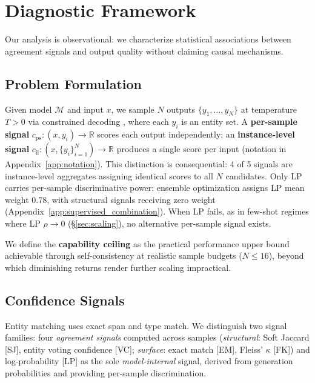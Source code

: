 \section{Diagnostic Framework}\label{sec:method}

Our analysis is observational: we characterize statistical associations between agreement signals and output quality without claiming causal mechanisms.

\subsection{Problem Formulation}\label{sec:formulation}

Given model $\mathcal{M}$ and input $x$, we sample $N$ outputs $\{y_1, \ldots, y_N\}$ at temperature $T > 0$ via constrained decoding \cite{willard2023guided}, where each $y_i$ is an entity set.
A \textbf{per-sample signal} $c_{\text{ps}}: (x, y_i) \to \mathbb{R}$ scores each output independently; an \textbf{instance-level signal} $c_{\text{il}}: (x, \{y_i\}_{i=1}^N) \to \mathbb{R}$ produces a single score per input (notation in Appendix~\ref{app:notation}).
This distinction is consequential: 4 of 5 signals are instance-level aggregates assigning identical scores to all $N$ candidates.
Only LP carries per-sample discriminative power: ensemble optimization assigns LP mean weight $0.78$, with structural signals receiving zero weight (Appendix~\ref{app:supervised_combination}).
When LP fails, as in few-shot regimes where LP $\rho{\to}0$ (\S\ref{sec:scaling}), no alternative per-sample signal exists.

We define the \textbf{capability ceiling} as the practical performance upper bound achievable through self-consistency at realistic sample budgets ($N{\leq}16$), beyond which diminishing returns render further scaling impractical.

\subsection{Confidence Signals}\label{sec:signals}

Entity matching uses exact span and type match.
We distinguish two signal families: four \textit{agreement signals} computed across samples (\textit{structural}: Soft Jaccard [SJ], entity voting confidence [VC]; \textit{surface}: exact match [EM], Fleiss' $\kappa$ [FK]) and log-probability [LP] as the sole \textit{model-internal} signal, derived from generation probabilities and providing per-sample discrimination.


